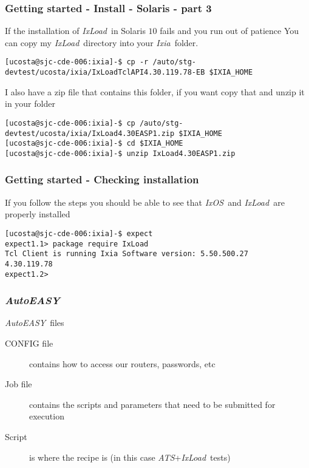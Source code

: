\documentclass{beamer}
\newcommand{\ixload}{\emph{IxLoad}}
\newcommand{\ixos}{\emph{IxOS}}
\newcommand{\ats}{\emph{ATS}}
\newcommand{\autoeasy}{\emph{AutoEASY}}
\newcommand{\ixia}{\emph{Ixia}}
\begin{document}
\begin{frame}[fragile] \frametitle{Getting started - Install - Solaris - part 3}
\begin{block}{If the installation of \ixload~in Solaris $10$ fails and you run out of patience}
You can copy my \ixload~directory into your \ixia~folder.
\begin{lstlisting}[language=Terminal]
[ucosta@sjc-cde-006:ixia]-$ cp -r /auto/stg-devtest/ucosta/ixia/IxLoadTclAPI4.30.119.78-EB $IXIA_HOME
\end{lstlisting}
\end{block}
I also have a zip file that contains this folder, if you want copy that and unzip it in your folder
\begin{block}{}
\begin{lstlisting}[language=Terminal]
[ucosta@sjc-cde-006:ixia]-$ cp /auto/stg-devtest/ucosta/ixia/IxLoad4.30EASP1.zip $IXIA_HOME
[ucosta@sjc-cde-006:ixia]-$ cd $IXIA_HOME
[ucosta@sjc-cde-006:ixia]-$ unzip IxLoad4.30EASP1.zip
\end{lstlisting}
\end{block}
\end{frame}

\begin{frame}[fragile] \frametitle{Getting started - Checking installation}
If you follow the steps you should be able to see that \ixos~and \ixload~are properly installed
\begin{block}{}
\begin{lstlisting}[language=Terminal]
[ucosta@sjc-cde-006:ixia]-$ expect
expect1.1> package require IxLoad
Tcl Client is running Ixia Software version: 5.50.500.27
4.30.119.78
expect1.2>
\end{lstlisting}
\end{block}
\end{frame}

\begin{frame}[fragile] \frametitle{\autoeasy}
\begin{block}{\autoeasy~files}
\begin{description}
	\item[CONFIG file] contains how to access our routers, passwords, etc
	\item[Job file] contains the scripts and parameters that need to be submitted for execution
	\item[Script] is where the recipe is (in this case \ats+\ixload~tests)
\end{description}
\end{block}
\end{frame}
\end{document}
